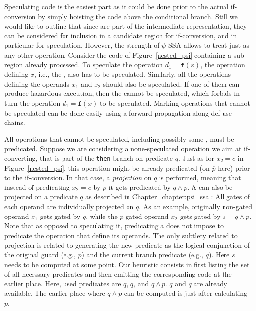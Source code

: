 Speculating code is the easiest part as it could be done prior to the actual if-conversion by simply hoisting the code above the conditional branch. Still we would like to outline that since \psifuns are part of the intermediate representation, they can be considered for inclusion in a candidate region for if-conversion, and in particular for speculation. However, the strength of $\psi$-SSA allows to treat \psifuns just as any other operation. Consider the code of Figure~\ref{nested_psi} containing a sub region already processed. To speculate the operation $d_1=\texttt{f}(x)$, the operation defining $x$, i.e., the \psifun, also has to be speculated. Similarly, all the operations defining the operands $x_1$ and $x_2$ should also be speculated. If one of them can produce hazardous execution, then the \psifun cannot be speculated, which forbids in turn the operation $d_1=\texttt{f}(x)$ to be speculated. Marking operations that cannot be speculated can be done easily using a forward propagation along def-use chains.

All operations that cannot be speculated, including possibly some \psifuns, must be predicated. Suppose we are considering a none-speculated operation we aim at if-converting, that is part of the \texttt{then} branch on predicate $q$. Just as for $x_2=c$ in Figure~\ref{nested_psi}, this operation might be already predicated (on $\overline{p}$ here) prior to the if-conversion. In that case, a \textit{projection} on $q$ is performed, meaning that instead of predicating $x_2=c$ by $\overline{p}$ it gets predicated by $q\wedge \overline{p}$. A \psifun can also be projected on a predicate $q$ as described in Chapter~\ref{chapter:psi_ssa}: All gates of each operand are individually projected on $q$. As an example, originally non-gated operand $x_1$ gets gated by $q$, while the $\overline{p}$ gated operand $x_2$ gets gated by $s=q\wedge\overline{p}$. Note that as opposed to speculating it, predicating a \psifun does not impose to predicate the operation that define its operands. The only subtlety related to projection is related to generating the new predicate as the logical conjunction of the original guard (e.g., $\overline{p}$) and the current branch predicate (e.g., $q$). Here $s$ needs to be computed at some point. Our heuristic consists in first listing the set of all necessary predicates and then emitting the corresponding code at the earlier place. Here, used predicates are $q$, $\overline{q}$, and $q\wedge\overline{p}$. $q$ and $\overline{q}$ are already available. The earlier place where $q\wedge\overline{p}$ can be computed is just after calculating $p$.

